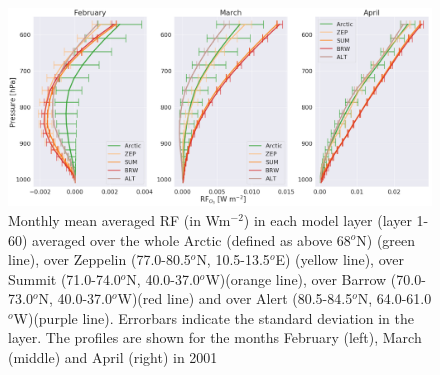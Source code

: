 \begin{figure}[ht]
    \centering
    \includegraphics{Chapter6_Results/images/RF/vert_RF_FebApr_2001.png}
    \caption{Monthly mean averaged RF (in Wm$^{-2}$) in each model layer (layer 1-60) averaged over the whole Arctic (defined as above 68$^o$N) (green line), over Zeppelin (77.0-80.5$^o$N, 10.5-13.5$^o$E) (yellow line), over Summit (71.0-74.0$^o$N, 40.0-37.0$^o$W)(orange line), over Barrow (70.0-73.0$^o$N, 40.0-37.0$^o$W)(red line) and over Alert (80.5-84.5$^o$N, 64.0-61.0$^o$W)(purple line). Errorbars indicate the standard deviation in the layer. The profiles are shown for the months February (left), March (middle) and April (right) in 2001}
    \label{fig:vert_RF_FebApr_2001}
\end{figure}